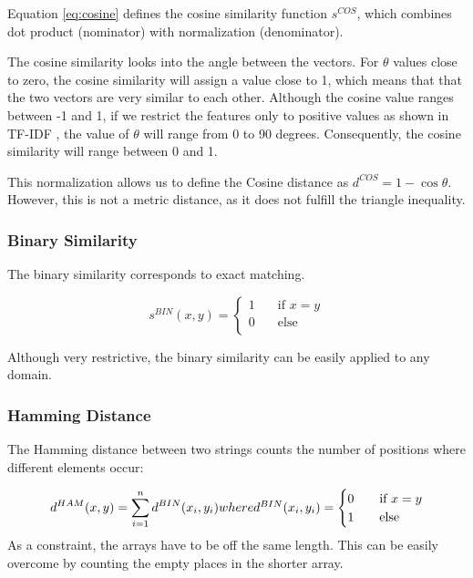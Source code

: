 Equation \ref{eq:cosine} defines the cosine similarity function $s^{COS}$, which combines dot product (nominator) with normalization (denominator).


The cosine similarity looks into the angle between the vectors. 
For $\theta$ values close to zero, the cosine similarity will assign a value close to 1, which means that that the two vectors are very similar to each other. 
Although the cosine value ranges between -1 and 1, if we restrict the features only to positive values as shown in TF-IDF 
, the value of $\theta$ will range from 0 to 90 degrees. 
Consequently, the cosine similarity will range between 0 and 1.

This normalization allows us to define the Cosine distance as 
$d^{COS}=1 - \cos \theta$. 
However, this is not a metric distance, as it does not fulfill the triangle inequality.

\subsubsection{Binary Similarity}
The binary similarity corresponds to exact matching. 

\begin{equation}
s^{BIN}(x,y)=
\begin{cases}
1  & \quad \text{if } x=y \\
0  & \quad \text{else }\\
\end{cases}
\label{eq:binary} 
\end{equation}

Although very restrictive, the binary similarity can be easily applied to any domain. 
 
\subsubsection{Hamming Distance}
The Hamming distance between two strings counts the number of positions where different elements occur:

\begin{equation}
	d^{HAM}(x,y) = \sum_{i=1}^{n}d^{BIN}(x_{i},y_{i}) $$where$$ 
	d^{BIN}(x_{i},y_{i})=
	\begin{cases}
	0  & \quad \text{if } x=y \\
	1  & \quad \text{else }\\
	\end{cases}
\end{equation}
As a constraint, the arrays have to be off the same length. 
This can be easily overcome by counting the empty places in the shorter array. 

